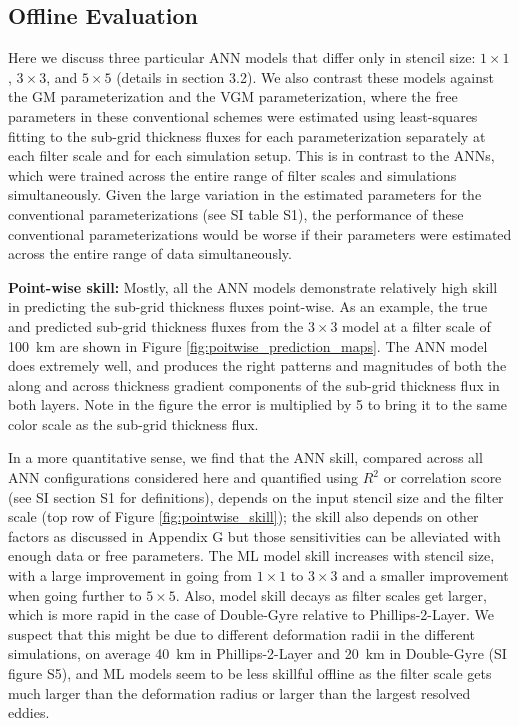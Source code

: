 \documentclass[draft]{agujournal2019}
\begin{document}
\subsection{Offline Evaluation}
Here we discuss three particular ANN models that differ only in stencil size: $1\times1$, $3\times3$, and $5\times5$ (details in section 3.2). We also contrast these models against the GM parameterization and the VGM parameterization, where the free parameters in these conventional schemes were estimated using least-squares fitting to the sub-grid thickness fluxes for each parameterization separately at each filter scale and for each simulation setup. This is in contrast to the ANNs, which were trained across the entire range of filter scales and simulations simultaneously. Given the large variation in the estimated parameters for the conventional parameterizations (see SI table S1), the performance of these conventional parameterizations would be worse if their parameters were estimated across the entire range of data simultaneously.

\textbf{Point-wise skill:}
Mostly, all the ANN models demonstrate relatively high skill in predicting the sub-grid thickness fluxes point-wise. As an example, the true and predicted sub-grid thickness fluxes from the $3\times3$ model at a filter scale of 100~km are shown in Figure \ref{fig:poitwise_prediction_maps}. The ANN model does extremely well, and produces the right patterns and magnitudes of both the along and across thickness gradient components of the sub-grid thickness flux in both layers. Note in the figure the error is multiplied by 5 to bring it to the same color scale as the sub-grid thickness flux. 

In a more quantitative sense, we find that the ANN  skill, compared across all ANN configurations considered here and quantified using $R^2$ or correlation score (see SI section S1 for definitions), depends on the input stencil size and the filter scale (top row of Figure \ref{fig:pointwise_skill}); the skill also depends on other factors as discussed in Appendix G but those sensitivities can be alleviated with enough data or free parameters. The ML model skill increases with stencil size, with a large improvement in going from $1\times1$ to $3\times3$ and a smaller improvement when going further to $5\times5$. Also, model skill  decays as filter scales get larger, which is more rapid in the case of Double-Gyre relative to Phillips-2-Layer. We suspect that this might be due to different deformation radii in the different simulations, on average 40~km in Phillips-2-Layer and 20~km in Double-Gyre (SI figure S5), and ML models seem to be less skillful offline as the filter scale gets much larger than the deformation radius or larger than the largest resolved eddies. 
\end{document}
